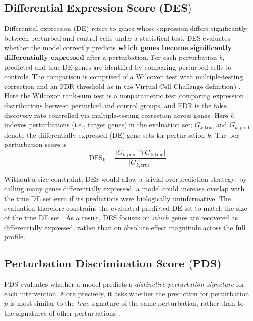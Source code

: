 \documentclass[12pt]{article}
\begin{document}
\subsection{Differential Expression Score (DES)}
Differential expression (DE) refers to genes whose expression differs significantly between perturbed and control cells under a statistical test.
DES evaluates whether the model correctly predicts \textbf{which genes become significantly
differentially expressed} after a perturbation. For each perturbation \(k\), predicted and true DE
genes are identified by comparing perturbed cells to controls. The comparison is comprised of a Wilcoxon test with multiple-testing
correction and an FDR threshold as in the Virtual Cell Challenge definition) \cite{virtualcellchallenge_eval}. Here the Wilcoxon rank-sum test is a nonparametric test comparing expression distributions between perturbed and control groups, and FDR is the false discovery rate controlled via multiple-testing correction across genes. Here \(k\) indexes perturbations (i.e., target genes) in the evaluation set; \(G_{k,\mathrm{true}}\) and
\(G_{k,\mathrm{pred}}\) denote the differentially expressed (DE) gene sets for perturbation \(k\). The
per-perturbation score is
\[
\mathrm{DES}_k = \frac{\lvert G_{k,\mathrm{pred}} \cap G_{k,\mathrm{true}} \rvert}{\lvert G_{k,\mathrm{true}} \rvert}.
\]

Without a size constraint, DES would allow a trivial overprediction strategy: by calling many genes differentially expressed, a model could increase overlap with the true DE set even if its predictions were biologically uninformative. The evaluation therefore constrains the evaluated predicted DE set to match the size of the true DE set \cite{virtualcellchallenge_eval}. As a result, DES focuses on \emph{which} genes are recovered as differentially expressed, rather than on absolute effect magnitude across the full profile.

\subsection{Perturbation Discrimination Score (PDS)}
PDS evaluates whether a model predicts a \emph{distinctive perturbation signature} for each intervention.
More precisely, it asks whether the prediction for perturbation \(p\) is most similar to the \emph{true}
signature of the same perturbation, rather than to the signatures of other perturbations
\cite{virtualcellchallenge_eval}.
\end{document}

